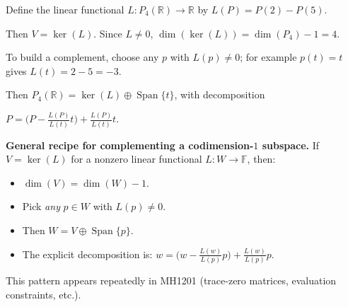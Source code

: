 \begin{extension}[title={Extension (Tutorial 3, Question 5, Method 2)}]

Define the linear functional $L:P_4(\mathbb{R})\to\mathbb{R}$ by $L(P)=P(2)-P(5)$.

Then $V=\ker(L)$. Since $L\neq 0$, $\dim(\ker(L))=\dim(P_4)-1=4$.

To build a complement, choose any $p$ with $L(p)\neq 0$; for example $p(t)=t$ gives $L(t)=2-5=-3$.

Then $P_4(\mathbb{R})=\ker(L)\oplus \operatorname{Span}\{t\}$, with decomposition

$P=\bigl(P-\tfrac{L(P)}{L(t)}t\bigr)+\tfrac{L(P)}{L(t)}t$.

\end{extension}

\begin{examtip}
\textbf{General recipe for complementing a codimension-$1$ subspace.}
If $V=\ker(L)$ for a nonzero linear functional $L:W\to\mathbb{F}$, then:
\begin{itemize}[leftmargin=*]
\item $\dim(V)=\dim(W)-1$.
\item Pick \emph{any} $p\in W$ with $L(p)\neq 0$.
\item Then $W=V\oplus\operatorname{Span}\{p\}$.
\item The explicit decomposition is: $w = \bigl(w-\tfrac{L(w)}{L(p)}p\bigr)+\tfrac{L(w)}{L(p)}p$.
\end{itemize}
This pattern appears repeatedly in MH1201 (trace-zero matrices, evaluation constraints, etc.).
\end{examtip}

